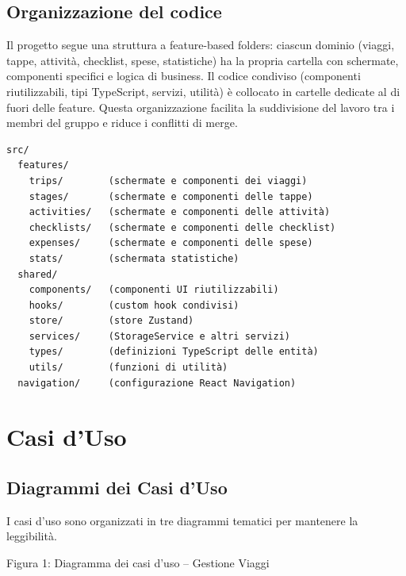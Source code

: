 \documentclass[12pt, a4paper]{article}
\begin{document}
\subsection{Organizzazione del codice}

Il progetto segue una struttura a feature-based folders: ciascun dominio (viaggi,
tappe, attività, checklist, spese, statistiche) ha la propria cartella con schermate,
componenti specifici e logica di business. Il codice condiviso (componenti riutilizzabili,
tipi TypeScript, servizi, utilità) è collocato in cartelle dedicate al di fuori delle
feature. Questa organizzazione facilita la suddivisione del lavoro tra i membri del
gruppo e riduce i conflitti di merge.

\begin{verbatim}
src/
  features/
    trips/        (schermate e componenti dei viaggi)
    stages/       (schermate e componenti delle tappe)
    activities/   (schermate e componenti delle attività)
    checklists/   (schermate e componenti delle checklist)
    expenses/     (schermate e componenti delle spese)
    stats/        (schermata statistiche)
  shared/
    components/   (componenti UI riutilizzabili)
    hooks/        (custom hook condivisi)
    store/        (store Zustand)
    services/     (StorageService e altri servizi)
    types/        (definizioni TypeScript delle entità)
    utils/        (funzioni di utilità)
  navigation/     (configurazione React Navigation)
\end{verbatim}

\section{Casi d'Uso}

\subsection{Diagrammi dei Casi d'Uso}

I casi d'uso sono organizzati in tre diagrammi tematici per mantenere la leggibilità.

\bigskip
\begin{center}

\medskip
{\small Figura 1: Diagramma dei casi d'uso -- Gestione Viaggi}
\end{center}
\end{document}
